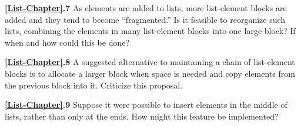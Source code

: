 \noindent\textbf{\ref*{List-Chapter}.7}
As elements are added to lists, more list-element blocks are
added and they tend to become ``fragmented.'' Is it feasible to
reorganize such lists, combining the elements in many list-element
blocks into one large block? If when and how could this be done?

\noindent\textbf{\ref*{List-Chapter}.8}
A suggested alternative to maintaining a chain of list-element
blocks is to allocate a larger block when space is needed and copy
elements from the previous block into it. Criticize this proposal.

\noindent\textbf{\ref*{List-Chapter}.9}
Suppose it were possible to insert elements in the middle of
lists, rather than only at the ends. How might this feature be
implemented?

